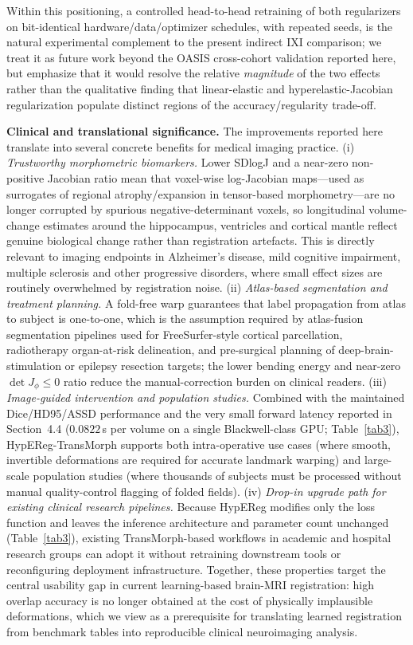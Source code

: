 \documentclass[jimaging,article,submit,pdftex,moreauthors]{Definitions/mdpi}
\begin{document}
Within this positioning, a controlled head-to-head retraining of both regularizers on bit-identical hardware/data/optimizer schedules, with repeated seeds, is the natural experimental complement to the present indirect IXI comparison; we treat it as future work beyond the OASIS cross-cohort validation reported here, but emphasize that it would resolve the relative \emph{magnitude} of the two effects rather than the qualitative finding that linear-elastic and hyperelastic-Jacobian regularization populate distinct regions of the accuracy/regularity trade-off.

\noindent\textbf{Clinical and translational significance.}
The improvements reported here translate into several concrete benefits for medical imaging practice. (i) \emph{Trustworthy morphometric biomarkers.} Lower SDlogJ and a near-zero non-positive Jacobian ratio mean that voxel-wise log-Jacobian maps---used as surrogates of regional atrophy/expansion in tensor-based morphometry---are no longer corrupted by spurious negative-determinant voxels, so longitudinal volume-change estimates around the hippocampus, ventricles and cortical mantle reflect genuine biological change rather than registration artefacts. This is directly relevant to imaging endpoints in Alzheimer's disease, mild cognitive impairment, multiple sclerosis and other progressive disorders, where small effect sizes are routinely overwhelmed by registration noise. (ii) \emph{Atlas-based segmentation and treatment planning.} A fold-free warp guarantees that label propagation from atlas to subject is one-to-one, which is the assumption required by atlas-fusion segmentation pipelines used for FreeSurfer-style cortical parcellation, radiotherapy organ-at-risk delineation, and pre-surgical planning of deep-brain-stimulation or epilepsy resection targets; the lower bending energy and near-zero \(\det J_\phi \le 0\) ratio reduce the manual-correction burden on clinical readers. (iii) \emph{Image-guided intervention and population studies.} Combined with the maintained Dice/HD95/ASSD performance and the very small forward latency reported in Section~4.4 ($0.0822$\,s per volume on a single Blackwell-class GPU; Table~\ref{tab3}), HypEReg-TransMorph supports both intra-operative use cases (where smooth, invertible deformations are required for accurate landmark warping) and large-scale population studies (where thousands of subjects must be processed without manual quality-control flagging of folded fields). (iv) \emph{Drop-in upgrade path for existing clinical research pipelines.} Because HypEReg modifies only the loss function and leaves the inference architecture and parameter count unchanged (Table~\ref{tab3}), existing TransMorph-based workflows in academic and hospital research groups can adopt it without retraining downstream tools or reconfiguring deployment infrastructure. Together, these properties target the central usability gap in current learning-based brain-MRI registration: high overlap accuracy is no longer obtained at the cost of physically implausible deformations, which we view as a prerequisite for translating learned registration from benchmark tables into reproducible clinical neuroimaging analysis.
\end{document}
